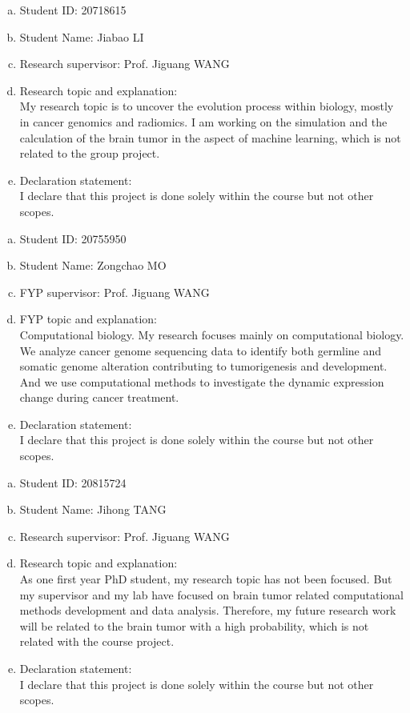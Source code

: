 \documentclass[11pt]{article}
\begin{document}
\begin{member}
	\begin{enumerate}[(a)]
		\item Student ID: 20718615
		\item Student Name: Jiabao LI
		\item Research supervisor: Prof. Jiguang WANG
		\item Research topic and explanation: \\
		My research topic is to uncover the evolution process within biology, mostly in cancer genomics and radiomics. I am working on the simulation and the calculation of the brain tumor in the aspect of machine learning, which is not related to the group project.
		\item Declaration statement: \\
		I declare that this project is done solely within the course but not other scopes.
	\end{enumerate}
\end{member}

\begin{member}
	\begin{enumerate}[(a)]
		\item Student ID: 20755950
		\item Student Name:  Zongchao MO
		\item FYP supervisor: Prof. Jiguang WANG
		\item FYP topic and explanation: \\
		Computational biology. My research focuses mainly on computational biology. We analyze cancer genome sequencing data to identify both germline and somatic genome alteration contributing to tumorigenesis and development. And we use computational methods to investigate the dynamic expression change during cancer treatment.
		\item Declaration statement: \\
		I declare that this project is done solely within the course but not other scopes.
	\end{enumerate}
\end{member}

\begin{member}
	\begin{enumerate}[(a)]
		\item Student ID: 20815724
		\item Student Name: Jihong TANG
		\item Research supervisor: Prof. Jiguang WANG
		\item Research topic and explanation: \\
		As one first year PhD student, my research topic has not been focused. But my supervisor and my lab have focused on brain tumor related computational  methods development and data analysis. Therefore, my future research work will be related to the brain tumor with a high probability, which is not related with the course project.
		\item Declaration statement: \\
		I declare that this project is done solely within the course but not other scopes.
	\end{enumerate}
\end{member}
\end{document}
